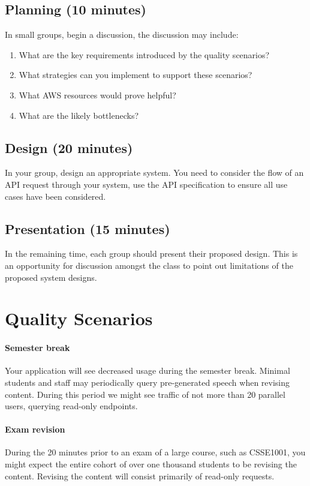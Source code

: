 \documentclass{csse4400}
\begin{document}
\subsection*{Planning (10 minutes)}
In small groups, begin a discussion,
the discussion may include:

\begin{enumerate}
    \item What are the key requirements introduced by the quality scenarios?
    \item What strategies can you implement to support these scenarios?
    \item What AWS resources would prove helpful?
    \item What are the likely bottlenecks?
\end{enumerate}

\subsection*{Design (20 minutes)}

In your group, design an appropriate system.
You need to consider the flow of an API request through your system,
use the API specification to ensure all use cases have been considered.

\subsection*{Presentation (15 minutes)}

In the remaining time,
each group should present their proposed design.
This is an opportunity for discussion amongst the class to point out limitations of the proposed system designs.

\section{Quality Scenarios}\label{sec:scenarios}

\paragraph{Semester break}
Your application will see decreased usage during the semester break.
Minimal students and staff may periodically query pre-generated speech when revising content.
During this period we might see traffic of not more than 20 parallel users,
querying read-only endpoints.

\paragraph{Exam revision}
During the 20 minutes prior to an exam of a large course, such as CSSE1001,
you might expect the entire cohort of over one thousand students to be revising the content.
Revising the content will consist primarily of read-only requests.
\end{document}
